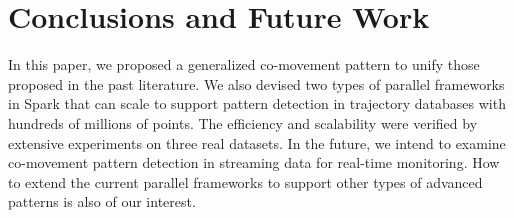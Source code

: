 \section{Conclusions and Future Work}
\label{sec:concl}
In this paper, we proposed a generalized co-movement pattern to unify those proposed in the past literature. We also devised two types of parallel frameworks in Spark that can scale to support pattern detection in trajectory databases with hundreds of millions of points. The efficiency and scalability were verified by extensive experiments on three real datasets. In the future, we intend to examine co-movement pattern detection in streaming data for real-time monitoring. How to extend the current parallel frameworks to support other types of advanced patterns is also of our interest.